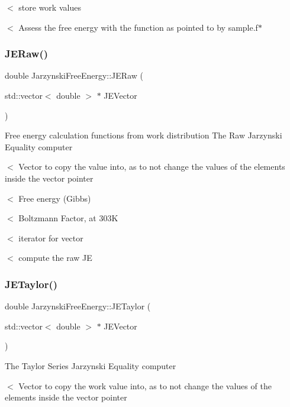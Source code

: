 $<$ store work values

$<$ Assess the free energy with the function as pointed to by sample.\+f$\ast$ \mbox{\label{classJarzynskiFreeEnergy_afadb2d232cfc8d15eb03aff7a5f0a56d}} 
\subsubsection{\texorpdfstring{J\+E\+Raw()}{JERaw()}}
{\footnotesize\ttfamily double Jarzynski\+Free\+Energy\+::\+J\+E\+Raw (\begin{DoxyParamCaption}\item[{std\+::vector$<$ double $>$ $\ast$}]{J\+E\+Vector }\end{DoxyParamCaption})}

Free energy calculation functions from work distribution The Raw Jarzynski Equality computer

$<$ Vector to copy the value into, as to not change the values of the elements inside the vector pointer

$<$ Free energy (Gibbs)

$<$ Boltzmann Factor, at 303K

$<$ iterator for vector

$<$ compute the raw JE \mbox{\label{classJarzynskiFreeEnergy_ab6cbfd29bad121a95411758c00f07b8f}} 
\subsubsection{\texorpdfstring{J\+E\+Taylor()}{JETaylor()}}
{\footnotesize\ttfamily double Jarzynski\+Free\+Energy\+::\+J\+E\+Taylor (\begin{DoxyParamCaption}\item[{std\+::vector$<$ double $>$ $\ast$}]{J\+E\+Vector }\end{DoxyParamCaption})}

The Taylor Series Jarzynski Equality computer

$<$ Vector to copy the work value into, as to not change the values of the elements inside the vector pointer

